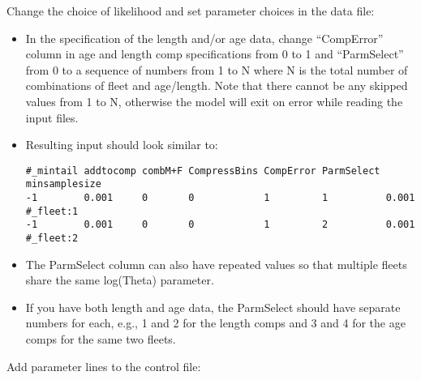 Change the choice of likelihood and set parameter choices in the data
file: 

\begin{itemize}
\item In the specification of the length and/or age data, change
``CompError'' column in age and length comp specifications from 0 to 1 and
``ParmSelect'' from 0 to a sequence of numbers from 1 to N where N is the
total number of combinations of fleet and age/length. Note that there
cannot be any skipped values from 1 to N, otherwise the model will exit
on error while reading the input files. 
	
\item Resulting input should look similar to:
\begin{small}
\begin{verbatim}
#_mintail addtocomp combM+F CompressBins CompError ParmSelect minsamplesize   
-1        0.001     0       0            1         1          0.001 #_fleet:1
-1        0.001     0       0            1         2          0.001 #_fleet:2
\end{verbatim}
\end{small}

\item The ParmSelect column can also have repeated values so that
multiple fleets share the same log(Theta) parameter. 
	
\item If you have both length and age data, the ParmSelect should have
separate numbers for each, e.g., 1 and 2 for the length comps and 3 and 4
for the age comps for the same two fleets. 
	
\end{itemize}

Add parameter lines to the control file:

